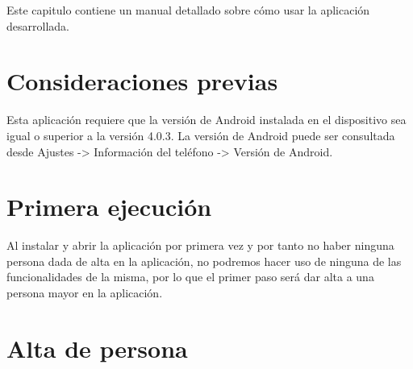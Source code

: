 


Este capitulo contiene un manual detallado sobre cómo usar la aplicación desarrollada.

\section{Consideraciones previas}

Esta aplicación requiere que la versión de Android instalada en el dispositivo sea igual o superior a la versión 4.0.3. La versión de Android puede ser consultada desde Ajustes -> Información del teléfono -> Versión de Android.

\section{Primera ejecución}

Al instalar y abrir la aplicación por primera vez y por tanto no haber ninguna persona dada de alta en la aplicación, no podremos hacer uso de ninguna de las funcionalidades de la misma, por lo que el primer paso será dar alta a una persona mayor en la aplicación.

\section{Alta de persona}




